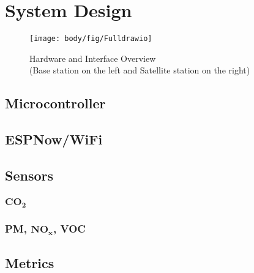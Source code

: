 \chapter{System Design}



\begin{figure}[!htb]
	\centering
	\texttt{[image: body/fig/Fulldrawio]}
	\caption{Hardware and Interface Overview \\(Base station on the left and Satellite station on the right) }
	\label{fig:fulldrawio}
\end{figure}


\section{Microcontroller}

\section{ESPNow/WiFi}

\section{Sensors}
\subsection{$\mathbf{CO_2}$}
\subsection{PM, $\mathbf{NO_x}$, VOC}

\section{Metrics}
